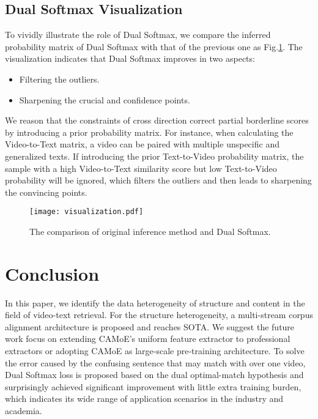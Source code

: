 \documentclass[letterpaper]{article} \usepackage{aaai22}  \usepackage{times}  \usepackage{helvet}  \usepackage{courier}  \usepackage[hyphens]{url}  \usepackage{graphicx} \urlstyle{rm} \def\UrlFont{\rm}  \usepackage{natbib}  \usepackage{caption}
\begin{document}
\subsection{Dual Softmax Visualization}
To vividly illustrate the role of Dual Softmax, we compare the inferred probability matrix of Dual Softmax with that of the previous one as Fig.\ref{visualization}. The visualization indicates that Dual Softmax improves in two aspects: 
\begin{itemize}
    \item Filtering the outliers.
    \item Sharpening the crucial and confidence points.
\end{itemize}
We reason that the constraints of cross direction correct partial borderline scores by introducing a prior probability matrix. For instance, when calculating the Video-to-Text matrix, a video can be paired with multiple unspecific and generalized texts. If introducing the prior Text-to-Video probability matrix, the sample with a high Video-to-Text similarity score but low Text-to-Video probability will be ignored, which filters the outliers and then leads to sharpening the 
convincing points.


\begin{figure}[h]
\begin{center}
\texttt{[image: visualization.pdf]}
\end{center}
\caption{The comparison of original inference method and Dual Softmax.}
\label{visualization}
\end{figure}

\section{Conclusion}
In this paper, we identify the data heterogeneity of structure and content in the field of video-text retrieval. For the structure heterogeneity, a multi-stream corpus alignment architecture is proposed and reaches SOTA. We suggest the future work focus on extending CAMoE's uniform feature extractor to professional extractors or adopting CAMoE as large-scale pre-training architecture.
To solve the error caused by the confusing sentence that may match with over one video, Dual Softmax loss is proposed based on the dual optimal-match hypothesis and surprisingly achieved significant improvement with little extra training burden, which indicates its wide range of application scenarios in the industry and academia. 
\end{document}
